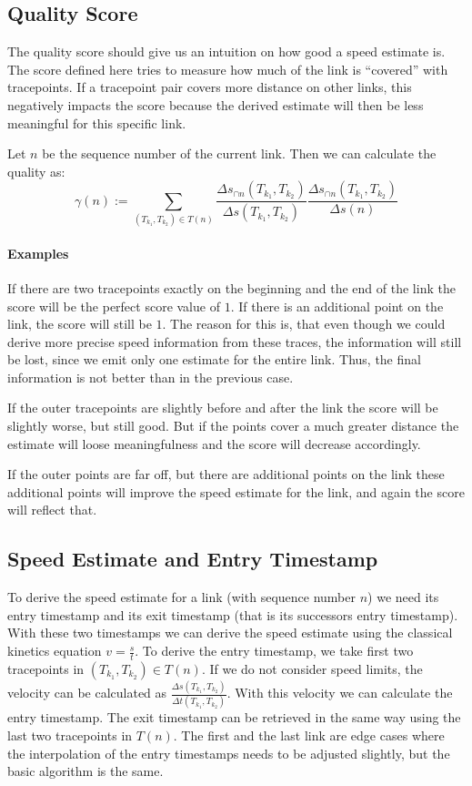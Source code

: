 \documentclass{scrartcl}
\begin{document}
\subsection{Quality Score}

The quality score should give us an intuition on how good a speed estimate is.
The score defined here tries to measure how much of the link is ``covered'' with tracepoints.
If a tracepoint pair covers more distance on other links, this negatively impacts the score because the derived estimate will then be less meaningful for this specific link.

Let $n$ be the sequence number of the current link.
Then we can calculate the quality as:
\[ \gamma(n) := \sum_{(T_{k_1}, T_{k_2}) \in T(n)} \frac{\Delta s_{\cap n}(T_{k_1}, T_{k_2})}{\Delta s(T_{k_1}, T_{k_2})} \frac{\Delta s_{\cap n}(T_{k_1}, T_{k_2})}{\Delta s(n)} \]

\paragraph{Examples}

If there are two tracepoints exactly on the beginning and the end of the link the score will be the perfect score value of $1$.
If there is an additional point on the link, the score will still be $1$.
The reason for this is, that even though we could derive more precise speed information from these traces, the information will still be lost, since we emit only one estimate for the entire link.
Thus, the final information is not better than in the previous case.

If the outer tracepoints are slightly before and after the link the score will be slightly worse, but still good.
But if the points cover a much greater distance the estimate will loose meaningfulness and the score will decrease accordingly.

If the outer points are far off, but there are additional points on the link these additional points will improve the speed estimate for the link, and again the score will reflect that.

\subsection{Speed Estimate and Entry Timestamp}

To derive the speed estimate for a link (with sequence number $n$) we need its entry timestamp and its exit timestamp (that is its successors entry timestamp).
With these two timestamps we can derive the speed estimate using the classical kinetics equation $v = \frac{s}{t}$.
To derive the entry timestamp, we take first two tracepoints in $(T_{k_1}, T_{k_2}) \in T(n)$.
If we do not consider speed limits, the velocity can be calculated as $\frac{\Delta s(T_{k_1}, T_{k_2})}{\Delta t(T_{k_1}, T_{k_2})}$.
With this velocity we can calculate the entry timestamp.
The exit timestamp can be retrieved in the same way using the last two tracepoints in $T(n)$.
The first and the last link are edge cases where the interpolation of the entry timestamps needs to be adjusted slightly, but the basic algorithm is the same.
\end{document}
